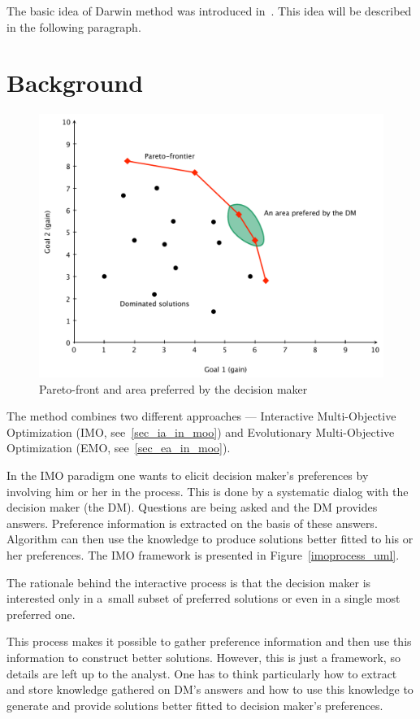 The basic idea of Darwin method was introduced in~\cite{GMS09}. This idea will
be described in the following paragraph.

\section{Background}

\begin{figure}
  \centering \includegraphics[scale=0.65]{img/pareto}
  \caption{Pareto-front and area preferred by the decision maker}
  \label{pareto}
\end{figure}

The method combines two different approaches --- Interactive Multi-Objective
Optimization (IMO, see~\ref{sec_ia_in_moo}) and Evolutionary Multi-Objective
Optimization (EMO, see~\ref{sec_ea_in_moo}).

In the IMO paradigm one wants to elicit decision maker's preferences by
involving him or her in the process. This is done by a systematic dialog with
the decision maker (the DM). Questions are being asked and the DM provides
answers. Preference information is extracted on the basis of these
answers. Algorithm can then use the knowledge to produce solutions better
fitted to his or her preferences. The IMO framework is presented in
Figure~\ref{imoprocess_uml}.

The rationale behind the interactive process is that the decision maker is
interested only in a~small subset of preferred solutions or even in a single
most preferred one.

This process makes it possible to gather preference information and then use
this information to construct better solutions. However, this is just a
framework, so details are left up to the analyst. One has to think
particularly how to extract and store knowledge gathered on DM's answers and
how to use this knowledge to generate and provide solutions better fitted to
decision maker's preferences.

